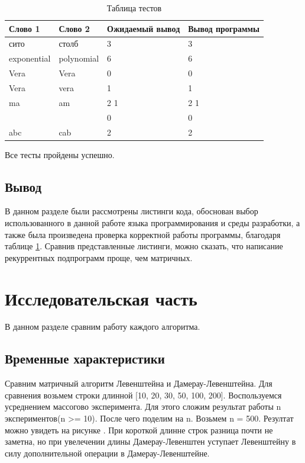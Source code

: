 \documentclass[12pt,a4paper]{report}
\begin{document}

\begin{table}[ht!]
	\centering
	\caption{Таблица тестов}
	\label{table:ref1}
	\begin{tabular}{ | l | l | l | l |}
		\hline
		Слово 1 & Слово 2 & Ожидаемый вывод &  Вывод программы  \\ \hline
		сито & столб & 3 & 3 \\ \hline
		exponential & polynomial & 6 & 6 \\ \hline
		Vera & Vera & 0 & 0 \\ \hline
		Vera & vera & 1 & 1 \\ \hline
		ma  & am & 2 1 &  2 1 \\ \hline
		& & 0 & 0 \\ \hline
		abc & cab & 2 & 2 \\ \hline
		\hline
	\end{tabular}
\end{table} 


Все тесты пройдены успешно.

\section{Вывод}

В данном разделе были рассмотрены листинги кода, обоснован выбор использованного в данной работе языка программирования и среды разработки, а также была произведена проверка корректной работы программы, благодаря таблице \ref{table:ref1}.
Сравнив представленные листинги, можно сказать, что написание рекуррентных подпрограмм проще, чем матричных.

\newpage
\chapter{Исследовательская часть}

В данном разделе сравним работу каждого алгоритма.

\section{Временные характеристики}

Сравним матричный алгоритм Левенштейна и Дамерау-Левенштейна. Для сравнения возьмем 
строки длинной [10, 20, 30, 50, 100, 200]. Воспользуемся усреднением массогово эксперимента.
Для этого сложим результат работы n экспериментов(n >= 10). После чего поделим на n.
Возьмем n = 500. Резултат можно увидеть на рисунке  . При короткой длинне строк разница почти
не заметна, но при увелечении длины Дамерау-Левенштен уступает Левенштейну в силу дополнительной операции в Дамерау-Левенштейне.
\end{document}
